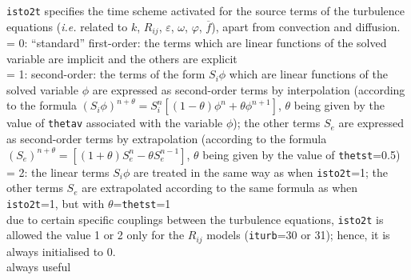 {{\tt isto2t} specifies the time scheme
activated for the source terms of the turbulence equations ({\em i.e.} related to $k$,
$R_{ij}$, $\varepsilon$, $\omega$, $\varphi$, $\overline{f}$), apart
from convection and diffusion.\\
\hspace*{1.3cm}= 0: ``standard'' first-order: the terms which are linear
functions of the solved variable are implicit and the others are explicit\\
\hspace*{1.3cm}= 1: second-order: the terms of the form $S_i\phi$ which are
linear functions of the solved variable
$\phi$ are expressed as second-order terms by interpolation (according
to the formula
$(S_i\phi)^{n+\theta}=S_i^n[(1-\theta)\phi^n+\theta\phi^{n+1}]$, $\theta$
being given by the value of {\tt thetav} associated with the variable $\phi$);
the other terms $S_e$ are expressed as second-order terms by
extrapolation (according to the formula
$(S_e)^{n+\theta}=[(1+\theta)S_e^n-\theta S_e^{n-1}]$, $\theta$ being
given by the value of {\tt thetst}=0.5)\\
\hspace*{1.3cm}= 2: the linear terms $S_i\phi$ are treated in the same
way as when {\tt isto2t}=1;
the other terms $S_e$ are extrapolated according to the same formula
as when {\tt isto2t}=1, but with $\theta$={\tt thetst}=1\\
due to certain specific couplings between the turbulence equations,
{\tt isto2t} is allowed the value 1 or 2 only for the $R_{ij}$ models
({\tt iturb}=30 or 31); hence, it is always initialised to 0.\\
always useful}


